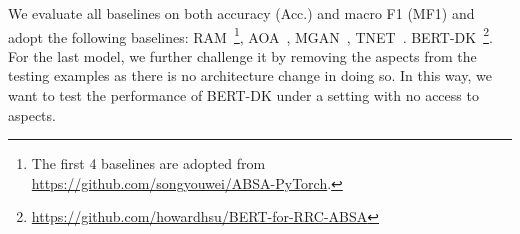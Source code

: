 We evaluate all baselines on both accuracy (Acc.) and macro F1 (MF1) and adopt the following baselines:
RAM~\cite{chen2017recurrent}\footnote{The first 4 baselines are adopted from \url{https://github.com/songyouwei/ABSA-PyTorch}.},
AOA~\cite{huang2018aspect},
MGAN~\cite{li2018exploiting},
TNET~\cite{li2018transformation}. 
BERT-DK~\cite{xu2019bert}\footnote{\url{https://github.com/howardhsu/BERT-for-RRC-ABSA}}. 
For the last model, we further challenge it by removing the aspects from the testing examples as there is no architecture change in doing so. 
In this way, we want to test the performance of BERT-DK under a setting with no access to aspects. 

